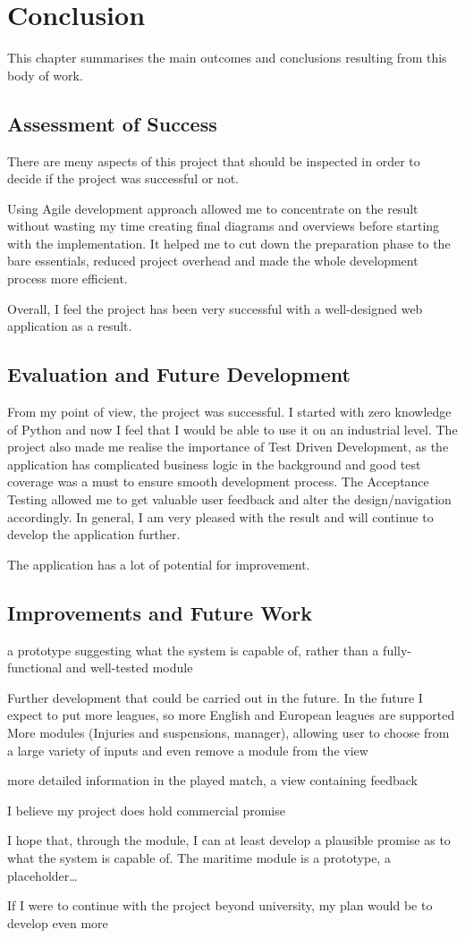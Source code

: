 \chapter{Conclusion}\label{ch:Conclusion}
This chapter summarises the main outcomes and conclusions resulting from this body of work.

\section{Assessment of Success}
There are meny aspects of this project that should be inspected in order to decide if the project was successful or not.

Using Agile development approach allowed me to concentrate on the result without wasting my time creating final diagrams and overviews before starting with the implementation. It helped me to cut down the preparation phase to the bare essentials, reduced project overhead and made the whole development process more efficient.

Overall, I feel the project has been very successful with a well-designed web application as a result.

\section{Evaluation and Future Development}
From my point of view, the project was successful. I started with zero knowledge of Python and now I feel that I would be able to use it on an industrial level. The project also made me realise the importance of Test Driven Development, as the application has complicated business logic in the background and good test coverage was a must to ensure smooth development process. The Acceptance Testing allowed me to get valuable user feedback and alter the design/navigation accordingly. In general, I am very pleased with the result and will continue to develop the application further.

The application has a lot of potential for improvement.

\section{Improvements and Future Work}
a prototype suggesting what the system is capable of, rather than a fully-functional and well-tested module

Further development that could be carried out in the future.
In the future I expect to put more leagues, so more English and European leagues are supported
More modules (Injuries and suspensions, manager), allowing user to choose from a large variety of inputs and even
remove a module from the view

more detailed information in the played match, a view containing feedback

 I believe my project does hold commercial promise
 
 I hope that, through the module, I can at least develop a plausible promise as to what the system is capable of. The maritime module is a prototype, a placeholder… 
 
 If I were to continue with the project beyond university, my plan would be to develop even more
